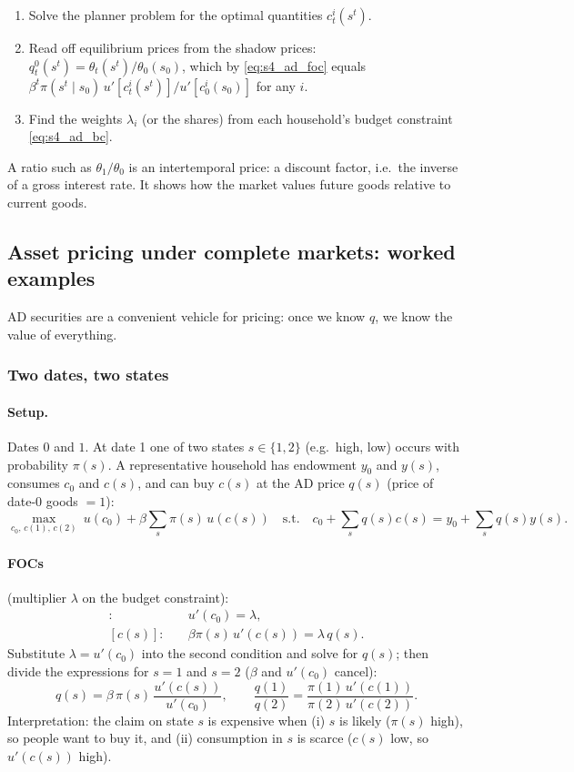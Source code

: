 \begin{keybox}[title=Welfare theorems as a computational shortcut]
\begin{enumerate}
  \item Solve the planner problem for the optimal quantities $c^i_t(s^t)$.
  \item Read off equilibrium prices from the shadow prices: $q^0_t(s^t)=\theta_t(s^t)/\theta_0(s_0)$, which by \eqref{eq:s4_ad_foc} equals $\beta^t\pi(s^t\mid s_0)\,u'[c^i_t(s^t)]/u'[c^i_0(s_0)]$ for any $i$.
  \item Find the weights $\lambda_i$ (or the shares) from each household's budget constraint \eqref{eq:s4_ad_bc}.
\end{enumerate}
A ratio such as $\theta_1/\theta_0$ is an intertemporal price: a discount factor, i.e.\ the inverse of a gross interest rate. It shows how the market values future goods relative to current goods.
\end{keybox}

\subsection{Asset pricing under complete markets: worked examples }

AD securities are a convenient vehicle for pricing: once we know $q$, we know the value of everything.

\subsubsection{Two dates, two states}
\paragraph{Setup.} Dates $0$ and $1$. At date 1 one of two states $s\in\{1,2\}$ (e.g.\ high, low) occurs with probability $\pi(s)$. A representative household has endowment $y_0$ and $y(s)$, consumes $c_0$ and $c(s)$, and can buy $c(s)$ at the AD price $q(s)$ (price of date-0 goods $=1$):
\[
  \max_{c_0,\,c(1),\,c(2)}\ u(c_0)+\beta\sum_s\pi(s)\,u(c(s))
  \quad\text{s.t.}\quad c_0+\sum_s q(s)c(s) = y_0+\sum_s q(s)y(s).
\]
\paragraph{FOCs} (multiplier $\lambda$ on the budget constraint):
\begin{align*}
  [c_0]:&\quad u'(c_0)=\lambda,\\
  [c(s)]:&\quad \beta\pi(s)\,u'(c(s))=\lambda\, q(s).
\end{align*}
Substitute $\lambda=u'(c_0)$ into the second condition and solve for $q(s)$; then divide the expressions for $s=1$ and $s=2$ ($\beta$ and $u'(c_0)$ cancel):
\[
  q(s) = \beta\,\pi(s)\,\frac{u'(c(s))}{u'(c_0)},
  \qquad
  \frac{q(1)}{q(2)} = \frac{\pi(1)\,u'(c(1))}{\pi(2)\,u'(c(2))}.
\]
Interpretation: the claim on state $s$ is expensive when (i) $s$ is likely ($\pi(s)$ high), so people want to buy it, and (ii) consumption in $s$ is scarce ($c(s)$ low, so $u'(c(s))$ high).

